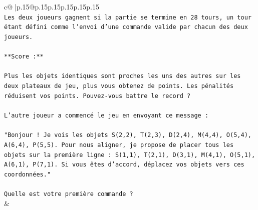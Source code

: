 \documentclass{article}
\begin{document}
{\begin{supertabular}{c@{$\;$}|p{.15\linewidth}@{}p{.15\linewidth}p{.15\linewidth}p{.15\linewidth}p{.15\linewidth}p{.15\linewidth}}
{{{\\ 
\texttt{Les deux joueurs gagnent si la partie se termine en 28 tours, un tour étant défini comme l'envoi d'une commande valide par chacun des deux joueurs.} \\
\\ 
\texttt{**Score :**} \\
\\ 
\texttt{Plus les objets identiques sont proches les uns des autres sur les deux plateaux de jeu, plus vous obtenez de points. Les pénalités réduisent vos points. Pouvez{-}vous battre le record ?} \\
\\ 
\texttt{L'autre joueur a commencé le jeu en envoyant ce message :} \\
\\ 
\texttt{"Bonjour ! Je vois les objets S(2,2), T(2,3), D(2,4), M(4,4), O(5,4), A(6,4), P(5,5). Pour nous aligner, je propose de placer tous les objets sur la première ligne : S(1,1), T(2,1), D(3,1), M(4,1), O(5,1), A(6,1), P(7,1). Si vous êtes d'accord, déplacez vos objets vers ces coordonnées."} \\
\\ 
\texttt{Quelle est votre première commande ?} \\
            }
        }
    }
    & \\ \\


\end{supertabular}}
\end{document}
